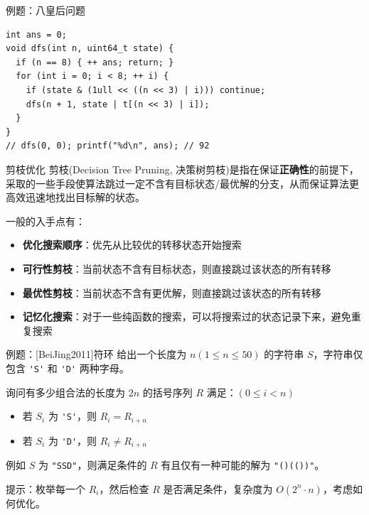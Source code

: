 \documentclass[12pt,aspectratio=169]{beamer}
\begin{document}
\begin{frame}[fragile]{例题：八皇后问题}
  \begin{verbatim}
int ans = 0;
void dfs(int n, uint64_t state) {
  if (n == 8) { ++ ans; return; }
  for (int i = 0; i < 8; ++ i) {
    if (state & (1ull << ((n << 3) | i))) continue;
    dfs(n + 1, state | t[(n << 3) | i]);
  }
}
// dfs(0, 0); printf("%d\n", ans); // 92
  \end{verbatim}
\end{frame}

\begin{frame}[fragile]{剪枝优化}
  剪枝(Decision Tree Pruning, 决策树剪枝)是指在保证\textbf{正确性}的前提下，采取的一些手段使算法跳过一定不含有目标状态/最优解的分支，从而保证算法更高效迅速地找出目标解的状态。\pause

  一般的入手点有：

  \begin{itemize}
    \item \textbf{优化搜索顺序}：优先从比较优的转移状态开始搜索
    \item \textbf{可行性剪枝}：当前状态不含有目标状态，则直接跳过该状态的所有转移
    \item \textbf{最优性剪枝}：当前状态不含有更优解，则直接跳过该状态的所有转移
    \item \textbf{记忆化搜索}：对于一些纯函数的搜索，可以将搜索过的状态记录下来，避免重复搜索
  \end{itemize}
\end{frame}

\begin{frame}[fragile]{例题：[BeiJing2011]符环}
  给出一个长度为 $n(1 \le n \le 50)$ 的字符串 $S$，字符串仅包含 \verb|'S'| 和 \verb|'D'| 两种字母。

  询问有多少组合法的长度为 $2n$ 的括号序列 $R$ 满足：$(0 \le i < n)$

  \begin{itemize}
    \item 若 $S_i$ 为 \verb|'S'|，则 $R_i = R_{i+n}$
    \item 若 $S_i$ 为 \verb|'D'|，则 $R_i \ne R_{i+n}$
  \end{itemize}

  例如 $S$ 为 \verb|"SSD"|，则满足条件的 $R$ 有且仅有一种可能的解为 \verb|"()(())"|。\pause

  提示：枚举每一个 $R_i$，然后检查 $R$ 是否满足条件，复杂度为 $O(2^n \cdot n)$，考虑如何优化。
\end{frame}
\end{document}
